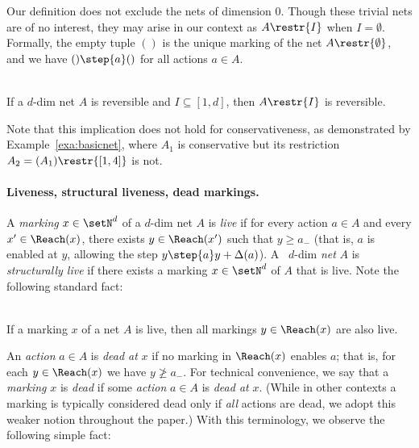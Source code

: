 \begin{rem}\label{rem:dimzero}
Our definition does not exclude the nets of dimension $0$. Though these
trivial nets are of no interest, they may arise in our context as
$A\restr{I}$ when $I=\emptyset$. Formally, the empty tuple
	$()$ is the unique marking of the net $A\restr{\emptyset}$,
	and we have $()\step{a}()$ for all actions $a\in A$.
\end{rem}	

\begin{prop}\label{prop:restrpresrev}
\hfill\\
If a $d$-dim net $A$ is reversible and $I\subseteq[1,d]$, then 
$A\restr{I}$ is reversible.
\end{prop}

\noindent
Note that this implication does not hold for
conservativeness, as demonstrated by Example~\ref{exa:basicnet}, where
$A_1$ is conservative but its restriction $A_2=(A_1)\restr{[1,4]}$ is not.


\paragraph{Liveness, structural liveness, dead markings.}
A \emph{marking} $x\in\setN^d$ of a $d$-dim net $A$ is \emph{live} if
for every action $a\in A$ and every $x'\in \Reach(x)$, 
 there exists $y\in \Reach(x')$ such that
 $y\geq a_-$ (that is, $a$ is enabled at $y$, allowing the step
 $y\step{a}y+\Delta(a)$).  A~ $d$-dim \emph{net} $A$ is \emph{structurally
 live} if there exists a marking $x\in\setN^d$ of $A$ that is live.
 Note the following standard fact:

\begin{prop}\label{prop:liveunderreach}
\hfill\\	
If a marking $x$ of a net $A$ is live, then all
 markings $y\in\Reach(x)$ are also live.
\end{prop}

\noindent
An \emph{action} $a\in A$ is \emph{dead at} $x$ if 
no marking in $\Reach(x)$ enables
$a$; that is, for each $y\in
\Reach(x)$ we have $y\ngeq a_-$.
For technical convenience, we say that
a \emph{marking} $x$ 
is \emph{dead} if some \emph{action} $a\in A$ is \emph{dead at} $x$.
(While in other contexts a marking is typically considered dead only if
\emph{all} actions are
dead, we adopt this weaker notion throughout the paper.) 
With this terminology, we observe the following simple fact:

